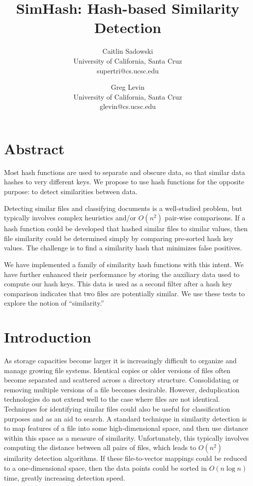 \documentclass[10pt, twocolumn]{article}
\begin{document}
\title{SimHash: Hash-based Similarity Detection}

\author{Caitlin Sadowski\\
University of California, Santa Cruz\\
supertri@cs.ucsc.edu
\and
Greg Levin\\
University of California, Santa Cruz\\
glevin@cs.ucsc.edu}


\def\copyrightspace{}

\maketitle

\section{Abstract}

Most hash functions are used to separate and obscure data, so that similar data hashes to very different keys.  We propose to use hash functions for the opposite purpose: to detect similarities between data. 

Detecting similar files and classifying documents is a well-studied problem, but typically involves complex heuristics and/or $O(n^2)$ pair-wise comparisons.  If a hash function could be developed that hashed similar files to similar values, then file similarity could be determined simply by comparing pre-sorted hash key values.  The challenge is to find a similarity hash that minimizes false positives. 

We have implemented a family of similarity hash functions with this intent.  We have further enhanced their performance by storing the auxiliary data used to compute our hash keys.  This data is used as a second filter after a hash key comparison indicates that two files are potentially similar.  We use these tests to explore the notion of ``similarity.''




\section{Introduction}

As storage capacities become larger it is increasingly difficult to organize and manage growing file systems. Identical copies or older versions of files often become separated and scattered across a directory structure. Consolidating or removing multiple versions of a file becomes desirable. However, deduplication technologies do not extend well to the case where files are not identical. Techniques for identifying similar files could also be useful for classification purposes and as an aid to search.  A standard technique in similarity detection is to map features of a file into some high-dimensional space, and then use distance within this space as a measure of similarity.  Unfortunately, this typically involves computing the distance between all pairs of files, which leads to $O(n^2)$ similarity detection algorithms.  If these file-to-vector mappings could be reduced to a one-dimensional space, then the data points could be sorted in $O(n \log n)$ time, greatly increasing detection speed.
\end{document}
